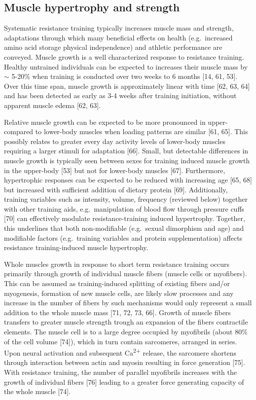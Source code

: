 \documentclass[twoside,10pt]{gihclass} %
\begin{document}
\hypertarget{muscle-hypertrophy-and-strength}{%
\subsection{Muscle hypertrophy and strength}\label{muscle-hypertrophy-and-strength}}

Systematic resistance training typically increases muscle mass and strength, adaptations through which many beneficial effects on health (e.g.~increased amino acid storage physical independence) and athletic performance are conveyed.
Muscle growth is a well characterized response to resistance training.
Healthy untrained individuals can be expected to increases their muscle mass by \(\sim\) 5-20\% when training is conducted over two weeks to 6 months
{[}14, 61, 53{]}.
Over this time span, muscle growth is approximately linear with time
{[}62, 63, 64{]}
and has been detected as early as 3-4 weeks after training initiation, without apparent muscle edema
{[}62, 63{]}.

Relative muscle growth can be expected to be more pronounced in upper- compared to lower-body muscles when loading patterns are similar
{[}61, 65{]}.
This possibly relates to greater every day activity levels of lower-body muscles requiring a larger stimuli for adaptation
{[}66{]}.
Small, but detectable differences in muscle growth is typically seen between sexes for training induced muscle growth in the upper-body
{[}53{]}
but not for lower-body muscles
{[}67{]}.
Furthermore, hypertrophic responses can be expected to be reduced with increasing age
{[}65, 68{]}
but increased with sufficient addition of dietary protein
{[}69{]}.
Additionally, training variables such as intensity, volume, frequency (reviewed below) together with other training aids, e.g.~manipulation of blood flow through pressure cuffs
{[}70{]}
can effectively modulate resistance-training induced hypertrophy.
Together, this underlines that both non-modifiable (e.g.~sexual dimorphism and age) and modifiable factors (e.g.~training variables and protein supplementation) affects resistance training-induced muscle hypertrophy.

Whole muscles growth in response to short term resistance training occurs primarily through growth of individual muscle fibers (muscle cells or myofibers).
This can be assumed as training-induced splitting of existing fibers and/or myogenesis, formation of new muscle cells, are likely slow processes and any increase in the number of fibers by such mechanisms would only represent a small addition to the whole muscle mass
{[}71, 72, 73, 66{]}.
Growth of muscle fibers transfers to greater muscle strength trough an expansion of the fibers contractile elements.
The muscle cell is to a large degree occupied by myofibrils
(about 80\% of the cell volume
{[}74{]}),
which in turn contain sarcomeres, arranged in series.
Upon neural activation and subsequent Ca\textsuperscript{2+} release, the sarcomere shortens through interaction between actin and myosin resulting in force generation
{[}75{]}.
With resistance training, the number of parallel myofibrils increases with the growth of individual fibers
{[}76{]}
leading to a greater force generating capacity of the whole muscle
{[}74{]}.
\end{document}
